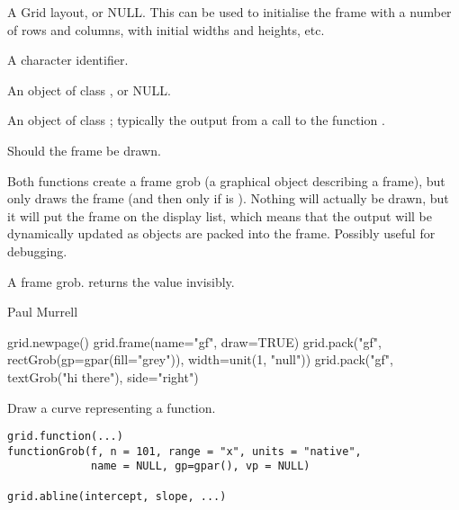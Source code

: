 %
\begin{Arguments}
\begin{ldescription}
\item[\code{layout}]  A Grid layout, or NULL. This can be used to initialise
the frame with a number of rows and columns, with initial widths
and heights, etc. 
\item[\code{name}]  A character identifier. 
\item[\code{vp}]  An object of class , or NULL. 
\item[\code{gp}]  An object of class ;  typically the output from
a call to the function .
\item[\code{draw}]  Should the frame be drawn.  
\end{ldescription}
\end{Arguments}
%
\begin{Details}\relax
Both functions create a frame grob (a graphical object describing a
frame), but only 
draws the frame (and then only if  is ).
Nothing will actually be
drawn, but it will put the frame on the display list, which means
that the output will be dynamically updated as objects are packed
into the frame.  Possibly useful for debugging.
\end{Details}
%
\begin{Value}
A frame grob.   returns the value invisibly.
\end{Value}
%
\begin{Author}\relax
 Paul Murrell 
\end{Author}
%
\begin{SeeAlso}\relax
{}
\end{SeeAlso}
%
\begin{Examples}
\begin{ExampleCode}
grid.newpage()
grid.frame(name="gf", draw=TRUE)
grid.pack("gf", rectGrob(gp=gpar(fill="grey")), width=unit(1, "null"))
grid.pack("gf", textGrob("hi there"), side="right")
\end{ExampleCode}
\end{Examples}
%
\begin{Description}\relax
Draw a curve representing a function.
\end{Description}
%
\begin{Usage}
\begin{verbatim}
grid.function(...)
functionGrob(f, n = 101, range = "x", units = "native",
             name = NULL, gp=gpar(), vp = NULL)

grid.abline(intercept, slope, ...) 
\end{verbatim}
\end{Usage}
